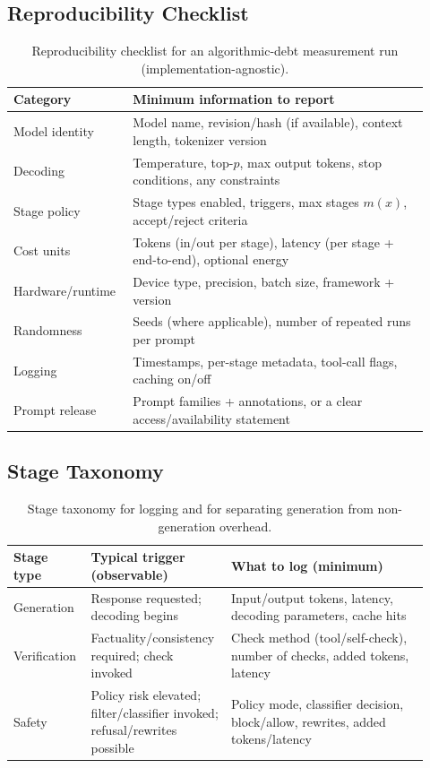 \documentclass{svjour3}
\begin{document}
\subsection{Reproducibility Checklist}
\begin{table}[t]
\centering
\small
\caption{Reproducibility checklist for an algorithmic-debt measurement run (implementation-agnostic).}
\label{tab:repro-checklist}
\small
\begin{tabular}{@{}p{0.24\linewidth}p{0.68\linewidth}@{}}
\toprule
Category & Minimum information to report \\
\midrule
Model identity & Model name, revision/hash (if available), context length, tokenizer version \\
Decoding & Temperature, top-$p$, max output tokens, stop conditions, any constraints \\
Stage policy & Stage types enabled, triggers, max stages $m(x)$, accept/reject criteria \\
Cost units & Tokens (in/out per stage), latency (per stage + end-to-end), optional energy \\
Hardware/runtime & Device type, precision, batch size, framework + version \\
Randomness & Seeds (where applicable), number of repeated runs per prompt \\
Logging & Timestamps, per-stage metadata, tool-call flags, caching on/off \\
Prompt release & Prompt families + annotations, or a clear access/availability statement \\
\bottomrule
\end{tabular}
\end{table}

\subsection{Stage Taxonomy}
\begin{table}[t]
\centering
\small
\caption{Stage taxonomy for logging and for separating generation from non-generation overhead.}
\label{tab:stage-taxonomy}
\small
\begin{tabular}{@{}p{0.16\linewidth}p{0.30\linewidth}p{0.46\linewidth}@{}}
\toprule
Stage type & Typical trigger (observable) & What to log (minimum) \\
\midrule
Generation & Response requested; decoding begins & Input/output tokens, latency, decoding parameters, cache hits \\
Verification & Factuality/consistency required; check invoked & Check method (tool/self-check), number of checks, added tokens, latency \\
Safety & Policy risk elevated; filter/classifier invoked; refusal/rewrites possible & Policy mode, classifier decision, block/allow, rewrites, added tokens/latency \\
\bottomrule
\end{tabular}
\end{table}
\end{document}

